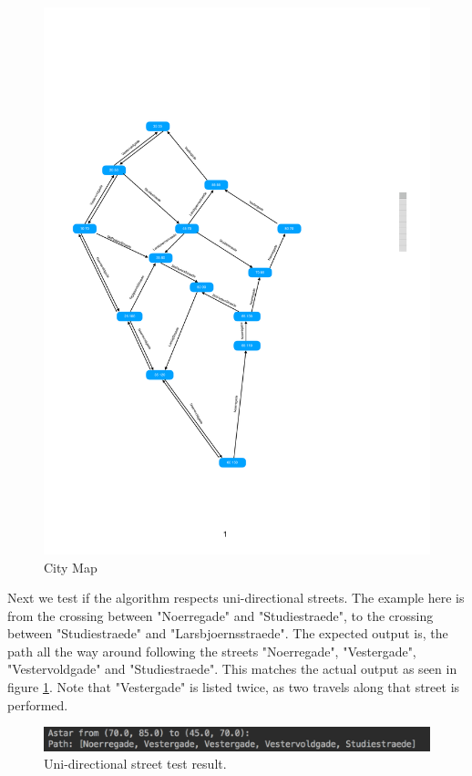 \begin{multicols}{2}
\begin{figure}[H]
  \begin{center}
    \includegraphics[width=0.9\linewidth]{RouteFinding/CityMap.pdf}
  \end{center}
  \caption{City Map}
\end{figure}

\end{multicols}

Next we test if the algorithm respects uni-directional streets. The example here is from the crossing between "Noerregade" and "Studiestraede", to the crossing between "Studiestraede" and "Larsbjoernsstraede". The expected output is, the path all the way around following the streets "Noerregade", "Vestergade", "Vestervoldgade" and "Studiestraede". This matches the actual output as seen in figure \ref{fig:test2}. Note that "Vestergade" is listed twice, as two travels along that street is performed.

\begin{figure}[H]
    \centering
    \includegraphics[width = 0.8\linewidth]{RouteFinding/RFtest2.png}
    \caption{Uni-directional street test result.}
    \label{fig:test2}
\end{figure}

